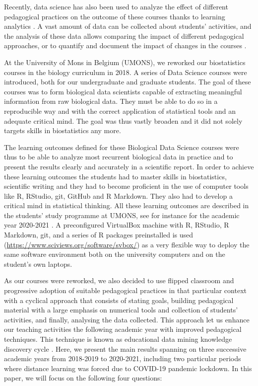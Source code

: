 \documentclass{aims}
\theoremstyle{definition}
\begin{document}
Recently, data science has also been used to analyze the effect of
different pedagogical practices on the outcome of these courses thanks
to learning analytics \cite{Estrellado2020}. A vast amount of data can
be collected about students' activities, and the analysis of these data
allows comparing the impact of different pedagogical approaches, or to
quantify and document the impact of changes in the courses
\cite{Romero2020}.

At the University of Mons in Belgium (UMONS), we reworked our
biostatistics courses in the biology curriculum in 2018. A series of
Data Science courses were introduced, both for our undergraduate and
graduate students. The goal of these courses was to form biological data
scientists capable of extracting meaningful information from raw
biological data. They must be able to do so in a reproducible way and
with the correct application of statistical tools and an adequate
critical mind. The goal was thus vastly broaden and it did not solely
targets skills in biostatistics any more.

The learning outcomes defined for these Biological Data Science courses
were thus to be able to analyze most recurrent biological data in
practice and to present the results clearly and accurately in a
scientific report. In order to achieve these learning outcomes the
students had to master skills in biostatistics, scientific writing and
they had to become proficient in the use of computer tools like R,
RStudio, git, GitHub and R Markdown. They also had to develop a critical
mind in statistical thinking. All these learning outcomes are described
in the students' study programme at UMONS, see for instance for the
academic year 2020-2021 \cite{ds1bio2021, ds2bio2021, ds3bio2021}. A
preconfigured VirtualBox machine with R, RStudio, R Markdown, git, and a
series of R packages preinstalled is used
(\url{https://www.sciviews.org/software/svbox/}) as a very flexible way
to deploy the same software environment both on the university computers
and on the student's own laptops.

As our courses were reworked, we also decided to use flipped classroom
and progressive adoption of suitable pedagogical practices in that
particular context with a cyclical approach that consists of stating
goals, building pedagogical material with a large emphasis on numerical
tools and collection of students' activities, and finally, analysing the
data collected. This approach let us enhance our teaching activities the
following academic year with improved pedagogical techniques. This
technique is known as educational data mining knowledge discovery cycle
\cite{Romero2020}. Here, we present the main results spanning on three
successive academic years from 2018-2019 to 2020-2021, including two
particular periods where distance learning was forced due to COVID-19
pandemic lockdown. In this paper, we will focus on the following four
questions:
\end{document}
